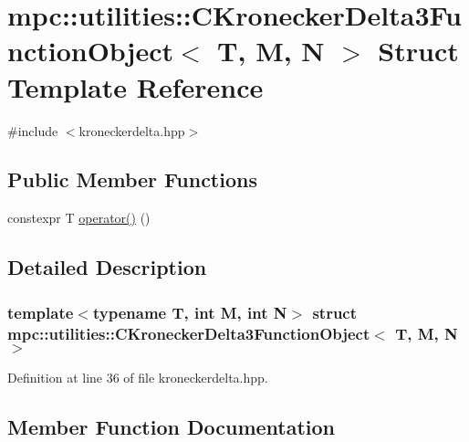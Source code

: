 \hypertarget{structmpc_1_1utilities_1_1_c_kronecker_delta3_function_object}{}\section{mpc\+:\+:utilities\+:\+:C\+Kronecker\+Delta3\+Function\+Object$<$ T, M, N $>$ Struct Template Reference}
\label{structmpc_1_1utilities_1_1_c_kronecker_delta3_function_object}


{\ttfamily \#include $<$kroneckerdelta.\+hpp$>$}

\subsection*{Public Member Functions}
\begin{DoxyCompactItemize}
\item 
constexpr T \mbox{\hyperlink{structmpc_1_1utilities_1_1_c_kronecker_delta3_function_object_a4ba89588535b6f7da764165062133549}{operator()}} ()
\end{DoxyCompactItemize}


\subsection{Detailed Description}
\subsubsection*{template$<$typename T, int M, int N$>$\newline
struct mpc\+::utilities\+::\+C\+Kronecker\+Delta3\+Function\+Object$<$ T, M, N $>$}



Definition at line 36 of file kroneckerdelta.\+hpp.



\subsection{Member Function Documentation}
\mbox{\label{structmpc_1_1utilities_1_1_c_kronecker_delta3_function_object_a4ba89588535b6f7da764165062133549}} 
